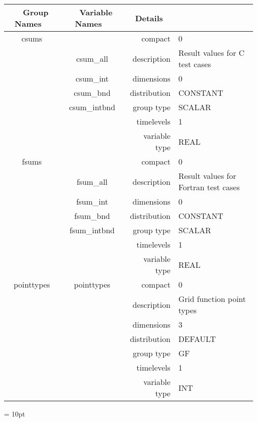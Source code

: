 \begin{tabular*}{150mm}{|c|c@{\extracolsep{\fill}}|rl|} \hline 
~ {\bf Group Names} ~ & ~ {\bf Variable Names} ~  &{\bf Details} ~ & ~\\ 
\hline 
csums &  & compact & 0 \\ 
 & csum\_all & description & Result values for C test cases \\ 
 & csum\_int & dimensions & 0 \\ 
 & csum\_bnd & distribution & CONSTANT \\ 
 & csum\_intbnd & group type & SCALAR \\ 
 &  & timelevels & 1 \\ 
 &  & variable type & REAL \\ 
\hline 
fsums &  & compact & 0 \\ 
 & fsum\_all & description & Result values for Fortran test cases \\ 
 & fsum\_int & dimensions & 0 \\ 
 & fsum\_bnd & distribution & CONSTANT \\ 
 & fsum\_intbnd & group type & SCALAR \\ 
 &  & timelevels & 1 \\ 
 &  & variable type & REAL \\ 
\hline 
pointtypes & pointtypes & compact & 0 \\ 
 &  & description & Grid function point types \\ 
 &  & dimensions & 3 \\ 
 &  & distribution & DEFAULT \\ 
 &  & group type & GF \\ 
 &  & timelevels & 1 \\ 
 &  & variable type & INT \\ 
\hline 
\end{tabular*} 



\vspace{5mm}\parskip = 10pt 
